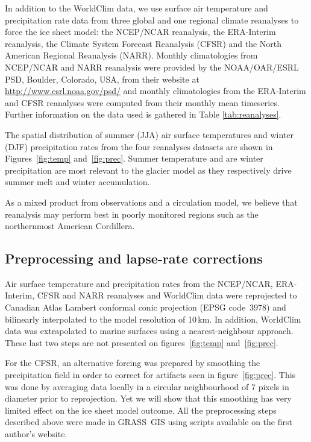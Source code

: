 In addition to the WorldClim data, we use surface air temperature and precipitation rate data from three global and one regional climate reanalyses to force the ice sheet model: the NCEP/NCAR reanalysis, the ERA-Interim reanalysis, the Climate System Forecast Reanalysis (CFSR) and the North American Regional Reanalysis (NARR). Monthly climatologies from NCEP/NCAR and NARR reanalysis were provided by the NOAA/OAR/ESRL PSD, Boulder, Colorado, USA, from their website at \url{http://www.esrl.noaa.gov/psd/} and monthly climatologies from the ERA-Interim and CFSR reanalyses were computed from their monthly mean timeseries. Further information on the data used is gathered in Table \ref{tab:reanalyses}.

The spatial distribution of summer (JJA) air surface temperatures and winter (DJF) precipitation rates from the four reanalyses datasets are shown in Figures~\ref{fig:temp} and~\ref{fig:prec}. Summer temperature and are winter precipitation are most relevant to the glacier model as they respectively drive summer melt and winter accumulation.

As a mixed product from observations and a circulation model, we believe that reanalysis may perform best in poorly monitored regions such as the northernmost American Cordillera.


\subsection{Preprocessing and lapse-rate corrections}

Air surface temperature and precipitation rates from the NCEP/NCAR, ERA-Interim, CFSR and NARR reanalyses and WorldClim data were reprojected to Canadian Atlas Lambert conformal conic projection (EPSG code~3978) and bilinearly interpolated to the model resolution of 10\,km. In addition, WorldClim data was extrapolated to marine surfaces using a nearest-neighbour approach. These last two steps are not presented on figures~\ref{fig:temp} and~\ref{fig:prec}.

For the CFSR, an alternative forcing was prepared by smoothing the precipitation field in order to correct for artifacts seen in figure~\ref{fig:prec}. This was done by averaging data locally in a circular neighbourhood of 7 pixels in diameter prior to reprojection. Yet we will show that this smoothing has very limited effect on the ice sheet model outcome. All the preprocessing steps described above were made in GRASS~GIS using scripts available on the first author's website.

